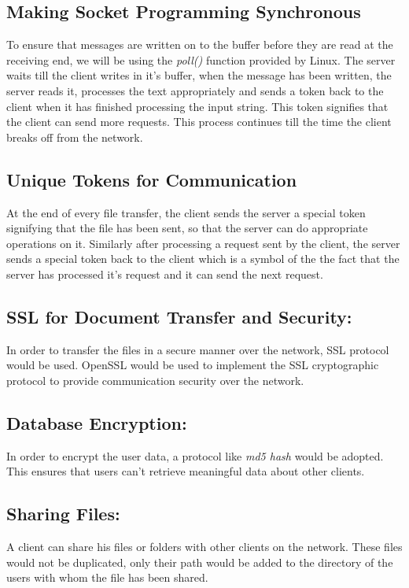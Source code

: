 \documentclass[]{article}
\begin{document}
\subsection{Making Socket Programming Synchronous}
To ensure that messages are written on to the buffer before they are read  at the receiving end, we will be using the \textit{poll()} function provided by Linux. The server waits till the client writes in it's buffer, when the message has been written, the server reads it, processes the text appropriately and sends a token back to the client when it has finished processing the input string. This token signifies that the client can send more requests. This process continues till the time the client breaks off from the network.

\subsection{Unique Tokens for Communication}
At the end of every file transfer, the client sends the server a special token signifying that the file has been sent, so that the server can do appropriate operations on it. Similarly after processing a request sent by the client, the server sends a special token back to the client which is a symbol of the the fact that the server has processed it's request and it can send the next request. 

\subsection{SSL for Document Transfer and Security:}
In order to transfer the files in a secure manner over the network, SSL protocol would be used. OpenSSL would be used to implement the SSL cryptographic protocol to provide communication security over the network.

\subsection{Database Encryption:}
In order to encrypt the user data, a protocol like \textit{md5 hash} would be adopted. This ensures that users can't retrieve meaningful data about other clients.

\subsection{Sharing Files:}
A client can share his files or folders with other clients on the network. These files would not be duplicated, only their path would be added to the directory of the users with whom the file has been shared.  
\end{document}
